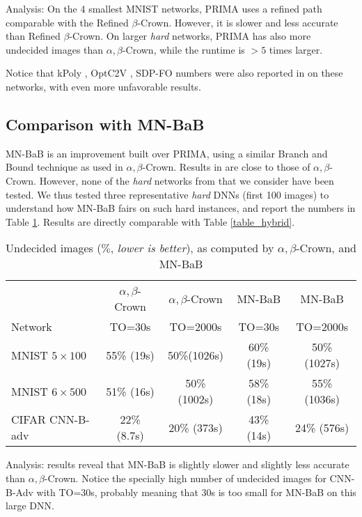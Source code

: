 Analysis: On the 4 smallest MNIST networks, PRIMA uses a refined path comparable with the Refined $\beta$-Crown. However, it is slower and less accurate than Refined $\beta$-Crown.
On larger {\em hard} networks, PRIMA has also more undecided images than $\alpha,\beta$-Crown, while the runtime is $>5$ times larger.

Notice that kPoly \cite{kpoly}, OptC2V \cite{optC2V}, SDP-FO \cite{SDPFI} numbers were also reported in \cite{crown} on these networks, with even more unfavorable results.

\subsection*{Comparison with MN-BaB}

MN-BaB \cite{ferrari2022complete} is an improvement built over PRIMA, using a similar Branch and Bound technique as used in $\alpha,\beta$-Crown. Results in \cite{ferrari2022complete}
are close to those of $\alpha,\beta$-Crown. However, none of the {\em hard} networks from \cite{crown} that we consider have been tested. We thus tested three representative {\em hard} DNNs (first 100 images) to understand how MN-BaB fairs on such hard instances, and report the numbers in Table \ref{table10}. Results are directly comparable with Table \ref{table_hybrid}.


\begin{table}[h!]
	\centering
	\begin{tabular}{||l||c|c||c|c||}
		\hline \hline
		 & $\alpha,\beta$-Crown & $\alpha,\beta$-Crown & MN-BaB & MN-BaB \\ 
		 Network & TO=30s & TO=2000s &  TO=30s & TO=2000s \\ 
		\hline
		MNIST $5 \times 100$ & 55\% (19s) & 50\%(1026s) & 60\% (19s) & 50\% (1027s) \\ \hline
		MNIST $6 \times 500$ & 51\% (16s) & 50\% (1002s) & 58\% (18s) & 55\% (1036s) \\ \hline
		CIFAR CNN-B-adv & 22\% (8.7s) & 20\% (373s) & 43\% (14s) & 24\% (576s) \\ \hline 
	\end{tabular}
	\caption{Undecided images ($\%$, {\em lower is better}), as computed by $\alpha,\beta$-Crown, and MN-BaB}
	\label{table10}
\end{table}

Analysis: results reveal that MN-BaB is slightly slower and slightly less accurate than $\alpha,\beta$-Crown. Notice the specially high number of undecided images for CNN-B-Adv with TO=30s, probably meaning that 30s is too small for MN-BaB on this large DNN.

